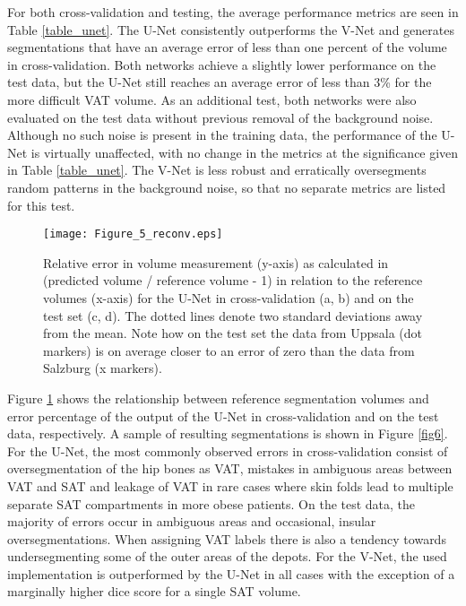 \documentclass[10pt,letterpaper]{article}
\begin{document}
	For both cross-validation and testing, the average performance metrics are seen in Table \ref{table_unet}. The U-Net consistently outperforms the V-Net and generates segmentations that have an average error of less than one percent of the volume in cross-validation. Both networks achieve a slightly lower performance on the test data, but the U-Net still reaches an average error of less than 3\% for the more difficult VAT volume. As an additional test, both networks were also evaluated on the test data without previous removal of the background noise. Although no such noise is present in the training data, the performance of the U-Net is virtually unaffected, with no change in the metrics at the significance given in Table \ref{table_unet}. The V-Net is less robust and erratically oversegments random patterns in the background noise, so that no separate metrics are listed for this test.


	\begin{figure}[H]
		\texttt{[image: Figure\_5\_reconv.eps]}

		\caption{Relative error in volume measurement (y-axis) as calculated in (predicted volume / reference volume - 1) in relation to the reference volumes (x-axis) for the U-Net in cross-validation (a, b) and on the test set (c, d). The dotted lines denote two standard deviations away from the mean. Note how on the test set the data from Uppsala (dot markers) is on average closer to an error of zero than the data from Salzburg (x markers).}

		\label{fig5} %

	\end{figure}
	Figure \ref{fig5} shows the relationship between reference segmentation volumes and error percentage of the output of the U-Net in cross-validation and on the test data, respectively. A sample of resulting segmentations is shown in Figure \ref{fig6}. For the U-Net, the most commonly observed errors in cross-validation consist of oversegmentation of the hip bones as VAT, mistakes in ambiguous areas between VAT and SAT and leakage of VAT in rare cases where skin folds lead to multiple separate SAT compartments in more obese patients. On the test data, the majority of errors occur in ambiguous areas and occasional, insular oversegmentations. When assigning VAT labels there is also a tendency towards undersegmenting some of the outer areas of the depots. For the V-Net, the used implementation is outperformed by the U-Net in all cases with the exception of a marginally higher dice score for a single SAT volume. \\
\end{document}

